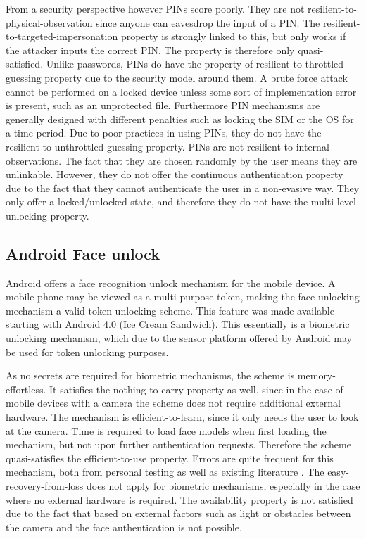 	From a security perspective however PINs score poorly. They are not resilient-to-physical-observation since anyone can eavesdrop the input of a PIN. The resilient-to-targeted-impersonation property is strongly linked to this, but only works if the attacker inputs the correct PIN. The property is therefore only quasi-satisfied.	Unlike passwords, PINs do have the property of resilient-to-throttled-guessing property due to the security model around them. A brute force attack cannot be performed on a locked device unless some sort of implementation error is present, such as an unprotected file. Furthermore PIN mechanisms are generally designed with different penalties such as locking the SIM or the OS for a time period. Due to poor practices in using PINs, they do not have the resilient-to-unthrottled-guessing property. PINs are not resilient-to-internal-observations. The fact that they are chosen randomly by the user means they are unlinkable. However, they do not offer the continuous authentication property due to the fact that they cannot authenticate the user in a non-evasive way. They only offer a locked/unlocked state, and therefore they do not have the multi-level-unlocking property. 
	
	\subsection{Android Face unlock}
	Android offers a face recognition unlock mechanism for the mobile device. A mobile phone may be viewed as a multi-purpose token, making the face-unlocking mechanism a valid token unlocking scheme. This feature was made available starting with Android 4.0 (Ice Cream Sandwich). This essentially is a biometric unlocking mechanism, which due to the sensor platform offered by Android may be used for token unlocking purposes.
	
	As no secrets are required for biometric mechanisms, the scheme is memory-effortless. It satisfies the nothing-to-carry property as well, since in the case of mobile devices with a camera the scheme does not require additional external hardware. The mechanism is efficient-to-learn, since it only needs the user to look at the camera. Time is required to load face models when first loading the mechanism, but not upon further authentication requests. Therefore the scheme quasi-satisfies the efficient-to-use property. Errors are quite frequent for this mechanism, both from personal testing as well as existing literature \cite{stajano2000resurrecting}. The easy-recovery-from-loss does not apply for biometric mechanisms, especially in the case where no external hardware is required. The availability property is not satisfied due to the fact that based on external factors such as light or obstacles between the camera and the face authentication is not possible.
	
